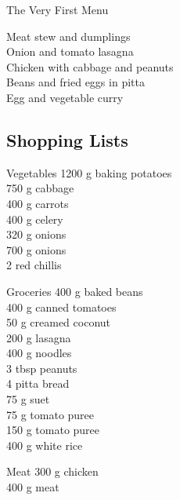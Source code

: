 
    
		\begin{menu}{The Very First Menu}

    Meat stew and dumplings\\
    Onion and tomato lasagna\\
    Chicken with cabbage and peanuts\\
    Beans and fried eggs in pitta\\
    Egg and vegetable curry\\
    
    \subsection*{Shopping Lists}
      \begin{shoppinglist}{Vegetables}
      1200 g baking potatoes \\ 
      750 g cabbage \\ 
      400 g carrots \\ 
      400 g celery \\ 
      320 g onions \\ 
      700 g onions \\ 
      2  red chillis \\ 
      \end{shoppinglist}%
      \begin{shoppinglist}{Groceries}
      400 g baked beans \\ 
      400 g canned tomatoes \\ 
      50 g creamed coconut \\ 
      200 g lasagna \\ 
      400 g noodles \\ 
      3 tbsp peanuts \\ 
      4  pitta bread \\ 
      75 g suet \\ 
      75 g tomato puree \\ 
      150 g tomato puree \\ 
      400 g white rice \\ 
      \end{shoppinglist}%
      \par\vfil %
      \begin{shoppinglist}{Meat}
      300 g chicken \\ 
      400 g meat \\ 

\end{shoppinglist}
\end{menu}
